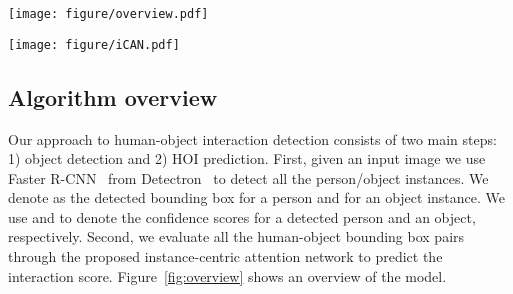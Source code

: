\documentclass{bmvc2k}
\newlength\figmargin
\newlength\secmargin
\newlength\figbmargin
\newcommand{\figref}[1]{Figure~\ref{fig:#1}}
\newcommand{\tb}[1]{\textbf{#1}}
\begin{document}
\begin{figure*}[t]
\centering
\texttt{[image: figure/overview.pdf]}

\vspace{\figmargin}
\caption{\tb{Overview of the proposed model.} 
The proposed model consists of following three major streams:
(1) a \textit{human stream} for detecting interaction based on human appearance;
(2) an \textit{object steam} that predicts the interaction based on object appearance;
(3) a \textit{pairwise stream} for encoding the spatial layouts between the human and object bounding boxes.
Given the detected object instances by the off-the-shelf Faster R-CNN, we generate the HOI hypothesis using all the human-object pairs.
The action scores from individual streams are then fused to produce the final prediction as shown on the right.
}
\vspace{\figbmargin}
\label{fig:overview}
\end{figure*} \begin{figure*}[t]
\centering
\texttt{[image: figure/iCAN.pdf]}

\vspace{\figmargin}
\caption{\tb{iCAN module.} Given the convolutional features of the image (shown in gray) and a human/object bounding box (shown in red), the iCAN module extracts the appearance features of the instance  (for human) or  (for object) as well as the features from the instance-centric attentional map.
For computing the attentional map, we measure the similarity in the embedding space with a bottleneck of 512 channels~\cite{vaswani2017attention,wang2017non}.
Specifically, we embed the image feature using a  convolution and the instance appearance feature  with a fully connected layer.
Here \texttt{res5} denotes the fifth residual block, \texttt{GAP} denotes a global average pooling layer, and \texttt{FC} denotes a fully connected layer. 
}
\vspace{\figbmargin}
\label{fig:iCAN}
\end{figure*} 
\vspace{\secmargin}
\subsection{Algorithm overview}
\label{sec:overview}
\vspace{\secmargin}

Our approach to human-object interaction detection consists of two main steps: 1) object detection and 2) HOI prediction.
First, given an input image we use Faster R-CNN~\cite{Ren-NIPS-FasterRCNN} from Detectron~\cite{Detectron} to detect all the person/object instances.
We denote  as the detected bounding box for a person and  for an object instance.
We use  and  to denote the confidence scores for a detected person and an object, respectively.
Second, we evaluate all the human-object bounding box pairs through the proposed instance-centric attention network to predict the interaction score.
\figref{overview} shows an overview of the model.
\end{document}
